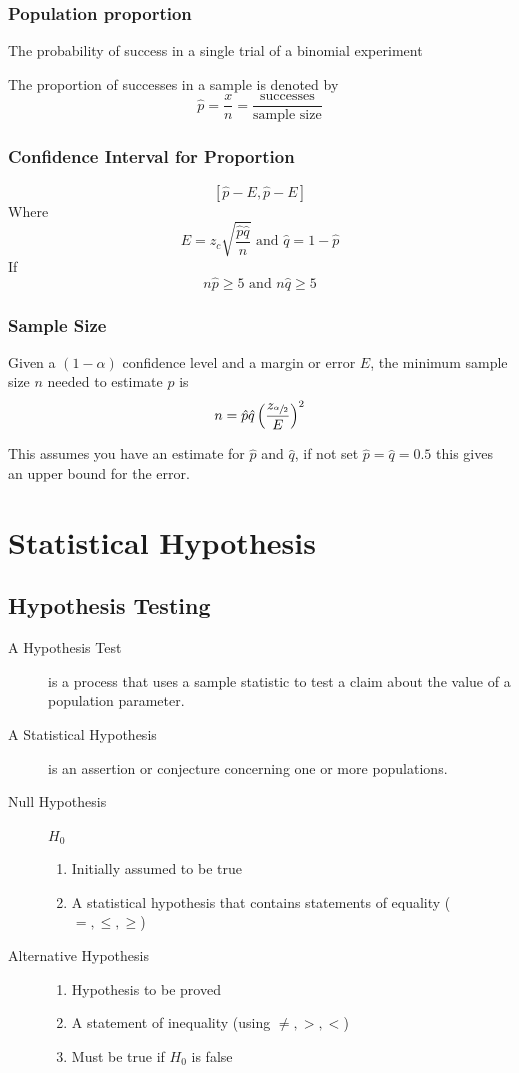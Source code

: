 \documentclass{book}
\begin{document}
\subsection{Population proportion}
The probability of success in a single trial of a binomial experiment

The proportion of successes in a sample is denoted by
$$\hat{p} = \frac{x}{n} = \frac{\text{successes}}{\text{sample size}}$$

\subsection{Confidence Interval for Proportion}
$$[\hat{p}-E, \hat{p}-E]$$
Where $$E=z_c \sqrt{\frac{\hat{p}\hat{q}}{n}}\text{ and } \hat{q} = 1 - \hat{p}$$
If $$n\hat{p} \ge 5 \text{ and } n\hat{q} \ge 5 $$

\subsection{Sample Size}
Given a $(1-\alpha)$ confidence level and a margin or error $E$, the minimum sample size $n$ needed to estimate $p$ is
$$n=\hat{p}\hat{q}\left ( \frac{z_{\sfrac{\alpha}{2}}}{E} \right )^2$$

This assumes you have an estimate for $\hat{p}$ and $\hat{q}$, if not set $\hat{p}=\hat{q}=0.5$ this gives an upper bound for the error.


\chapter{Statistical Hypothesis}

\section{Hypothesis Testing}
\begin{description}
\item[A Hypothesis Test] is a process that uses a sample statistic to test a claim about the value of a population parameter.
\item[A Statistical Hypothesis] is an assertion or conjecture concerning one or more populations.
\item[Null Hypothesis] $H_0$
	\begin{enumerate}
	\item Initially assumed to be true
	\item A statistical hypothesis that contains statements of equality ($=, \le, \ge$)
	\end{enumerate}
\item[Alternative Hypothesis]
	\begin{enumerate}
	\item Hypothesis to be proved
	\item A statement of inequality (using $\ne, >, <$)
	\item Must be true if $H_0$ is false
	\end{enumerate}
\end{description}
\end{document}
